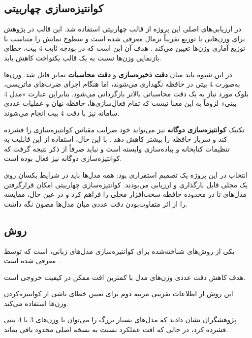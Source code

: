 \subsection{کوانتیزه‌سازی چهاربیتی }

در ارزیابی‌های اصلی این پروژه از قالب چهاربیتی
 استفاده شد. این قالب در پژوهش 
برای وزن‌هایی با توزیع تقریباً نرمال معرفی شده است و سطوح نمایش
را متناسب با توزیع آماری وزن‌ها تعیین می‌کند
\cite{dettmers2023qlora}. هدف آن این است که در بودجه ثابت 4 بیت،
خطای بازنمایی وزن‌ها نسبت به یک قالب یکنواخت کاهش یابد.

در این شیوه باید میان
\textbf{دقت ذخیره‌سازی}
و
\textbf{دقت محاسبات}
تمایز قائل شد. وزن‌ها به‌صورت 4 بیتی در حافظه نگهداری می‌شوند،
اما هنگام اجرای ضرب‌های ماتریسی، بلوک مورد نیاز به یک دقت محاسباتی
بالاتر بازگردانی می‌شود. بنابراین عبارت «مدل 4 بیتی» لزوماً به این
معنا نیست که تمام فعال‌سازی‌ها، حافظه نهان  و عملیات عددی
سامانه نیز با دقت 4 بیت انجام می‌شوند.

تکنیک
\textbf{کوانتیزه‌سازی دوگانه}
نیز می‌تواند خود ضرایب مقیاس کوانتیزه‌سازی را فشرده کند و سربار
حافظه را بیشتر کاهش دهد \cite{dettmers2023qlora}. با این حال، استفاده
از این قابلیت به تنظیمات کتابخانه و پیاده‌سازی وابسته است و نباید
صرفاً از ذکر  نتیجه گرفت که کوانتیزه‌سازی دوگانه نیز فعال
بوده است.

انتخاب  در این پروژه یک تصمیم استقراری بود: همه مدل‌ها باید
در شرایط یکسان روی یک  محلی قابل بارگذاری و ارزیابی می‌بودند.
کوانتیزه‌سازی چهاربیتی امکان قرارگرفتن مدل‌های  تا 
در محدوده حافظه سخت‌افزار محلی را فراهم کرد و در عین حال، مقایسه را
از اثر متفاوت‌بودن دقت عددی میان مدل‌ها مصون نگه داشت.


\subsection{روش }

یکی از روش‌های شناخته‌شده برای کوانتیزه‌سازی مدل‌های زبانی،
است که توسط
معرفی شده است
\cite{frantar2022gptq}.

هدف  کاهش دقت عددی وزن‌های مدل با کمترین افت ممکن در
کیفیت خروجی است.

این روش از اطلاعات تقریبی مرتبه دوم برای تعیین خطای ناشی از
کوانتیزه‌کردن وزن‌ها استفاده می‌کند.

پژوهشگران نشان دادند که مدل‌های بسیار بزرگ را می‌توان با
وزن‌های 3 یا 4 بیتی فشرده کرد، در حالی که افت عملکرد نسبت
به نسخه اصلی محدود باقی بماند.

